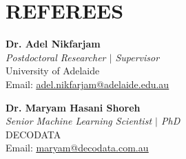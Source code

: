 \section{REFEREES}
\begin{itemize}[leftmargin=0.15in, label={}]
    \small{\item{
          \textbf{Dr. Adel Nikfarjam} \\
          \textit{Postdoctoral Researcher $|$ Supervisor} \\
          University of Adelaide \\
          Email: \href{mailto:adel.nikfarjam@adelaide.edu.au}{\underline{adel.nikfarjam@adelaide.edu.au}}
          }}

          \small{\item{
          \textbf{Dr. Maryam Hasani Shoreh} \\
          \textit{Senior Machine Learning Scientist $|$ PhD} \\
          DECODATA \\
          Email: \href{mailto:maryam@decodata.com.au}{\underline{maryam@decodata.com.au}} \\
          }}
\end{itemize}